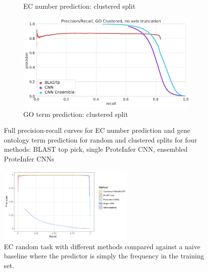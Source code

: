 \begin{figure}[ht]
\begin{subfigure}[b]{0.5\linewidth}
    \caption{EC number prediction: clustered split} 
    \label{fig:without_ensemble:c} 
  \end{subfigure}%
  \begin{subfigure}[b]{0.5\linewidth}
    \centering
    \includegraphics[width=0.9\linewidth]{prc_go_clustered_unzoomed.png}
    \caption{GO term prediction: clustered split} 
    \label{fig:without_ensemble:d} 
  \end{subfigure} 
  \caption{Full precision-recall curves for EC number prediction and gene ontology term prediction for random and clustered splits for four methods: BLAST top pick, single ProteInfer CNN, ensembled ProteInfer CNNs }
  \label{fig:without_ensemble} 
\end{figure}


\begin{figure}[htbp]
\centering
  \includegraphics[width=0.6\textwidth]{random_untruncated.pdf}
  \caption{EC random task with different methods compared against a naive baseline where the predictor is simply the frequency in the training set.}
  \label{sup:fig:naive}
\end{figure}

\clearpage



